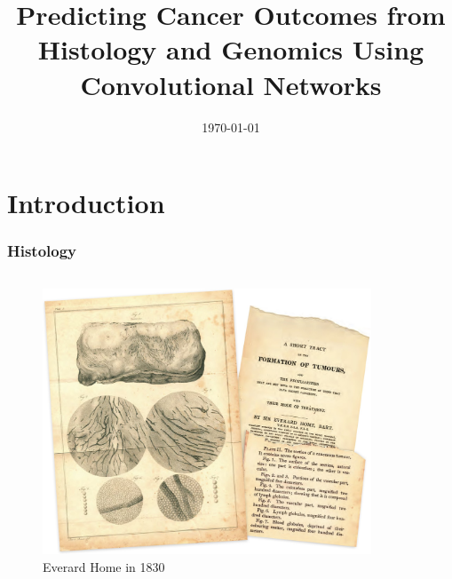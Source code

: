 \documentclass[usenames,dvipsnames]{beamer}
\title[SCNN]{Predicting Cancer Outcomes from Histology and Genomics Using Convolutional Networks}
\author[Dogan]
{%
\texorpdfstring{
  \begin{columns}
    \column{.85\linewidth}
    \centering
    Presented by:\\
    Haluk Dogan\\
    \url{https://haluk.github.io/}\\
    \href{mailto:hdogan@vivaldi.net}{hdogan@vivaldi.net} \\
    \vspace{0.5cm}
    \begin{tiny}Some slides copied from \\
    Prof. David Madigan, Columbia University\end{tiny}
  \end{columns}
}
{Dogan}
}
\institute[SBBI {\fontsize{5}{6}\selectfont @} CSE {\fontsize{5}{6}\selectfont
  @} UNL] %
{
  Department of Computer Science\\
  University of Nebraska-Lincoln
}
\date[\today] %
{\today}
\begin{document}
\begin{frame}
  \titlepage{}
\end{frame}

\section{Introduction}\label{sec:introduction}
\begin{frame}
  \frametitle{Histology}
  \begin{columns}[t]
    \begin{column}{.48\textwidth}
      \vspace{-0.8cm}
      \begin{figure}[ht]
        \centering
        \includegraphics[width=1.0\textwidth,height=0.7\textheight]{figures/early_histology.jpg}
        \caption*{Everard Home in 1830\label{fig:early-histology}}
      \end{figure}
    \end{column}
    \begin{column}{.48\textwidth}
      \vspace{-0.5cm}
      \begin{figure}[ht]
        \centering

\end{figure}
\end{column}
\end{columns}
\end{frame}
\end{document}
